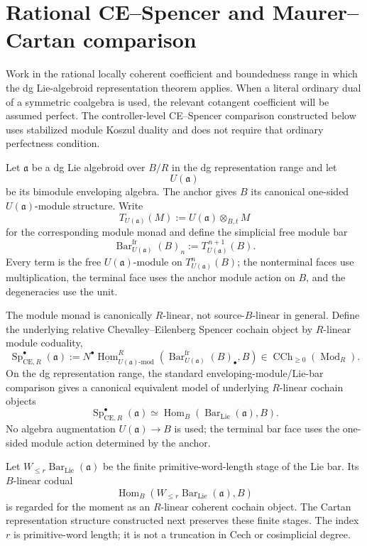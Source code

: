 \section{Rational CE--Spencer and Maurer--Cartan comparison}
\label{sec:as-rational-mc}

Work in the rational locally coherent coefficient and boundedness range in
which the dg Lie-algebroid representation theorem applies.  When a literal
ordinary dual of a symmetric coalgebra is used, the relevant cotangent
coefficient will be assumed perfect.  The controller-level CE--Spencer
comparison constructed below uses stabilized module Koszul duality and does
not require that ordinary perfectness condition.

\begin{definition}
\label{def:as-ce-spencer-resolution}
Let $\mathfrak a$ be a dg Lie algebroid over $B/R$ in the dg representation
range and let
\[
    U(\mathfrak a)
\]
be its bimodule enveloping algebra.  The anchor gives $B$ its canonical
one-sided $U(\mathfrak a)$-module structure.  Write
\[
    T_{U(\mathfrak a)}(M)
    :=
    U(\mathfrak a)\otimes_{B,t}M
\]
for the corresponding module monad and define the simplicial free module bar
\[
\boxed{
    \operatorname{Bar}^{\mathrm{fr}}_{U(\mathfrak a)}(B)_n
    :=
    T_{U(\mathfrak a)}^{\,n+1}(B).
}
\]
Every term is the free $U(\mathfrak a)$-module on
$T_{U(\mathfrak a)}^n(B)$; the nonterminal faces use multiplication, the
terminal face uses the anchor module action on $B$, and the degeneracies use
the unit.

The module monad is canonically $R$-linear, not source-$B$-linear in general.
Define the underlying relative Chevalley--Eilenberg Spencer cochain object by
$R$-linear module coduality,
\[
\boxed{
    \operatorname{Sp}_{\mathrm{CE},R}^{\bullet}(\mathfrak a)
    :=
    N^\bullet
    \underline{\operatorname{Hom}}^R_{
        U(\mathfrak a)\text{-}\mathrm{mod}}
    \left(
        \operatorname{Bar}^{\mathrm{fr}}_{U(\mathfrak a)}(B)_\bullet,
        B
    \right)
    \in
    \operatorname{CCh}_{\geq0}(\operatorname{Mod}_R).
}
\]
On the dg representation range, the standard enveloping-module/Lie-bar
comparison gives a canonical equivalent model of underlying $R$-linear
cochain objects
\[
\boxed{
    \operatorname{Sp}_{\mathrm{CE},R}^{\bullet}(\mathfrak a)
    \simeq
    \operatorname{Hom}_B
    \left(
        \operatorname{Bar}_{\mathrm{Lie}}(\mathfrak a),
        B
    \right).
}
\]
No algebra augmentation $U(\mathfrak a)\to B$ is used; the terminal bar face
uses the one-sided module action determined by the anchor.

Let
$W_{\le r}\operatorname{Bar}_{\mathrm{Lie}}(\mathfrak a)$
be the finite primitive-word-length stage of the Lie bar.  Its $B$-linear
codual
\[
    \operatorname{Hom}_B
    \left(
        W_{\le r}\operatorname{Bar}_{\mathrm{Lie}}(\mathfrak a),
        B
    \right)
\]
is regarded for the moment as an $R$-linear coherent cochain object.  The
Cartan representation structure constructed next preserves these finite
stages.  The index $r$ is primitive-word length; it is not a truncation in
Cech or cosimplicial degree.
\end{definition}

